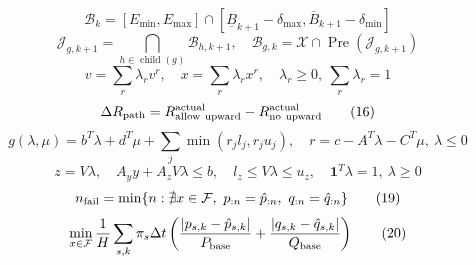 \documentclass{article}
\begin{document}
\begin{equation}
\mathcal B_k=[E_{\min},E_{\max}]\cap[\underline B_{k+1}-\delta_{\max},\overline B_{k+1}-\delta_{\min}]
\tag{13}
\end{equation}
\begin{equation}
\mathcal J_{g,k+1}=\bigcap_{h\in\operatorname{child}(g)}\mathcal B_{h,k+1},\quad\mathcal B_{g,k}=\mathcal X\cap\operatorname{Pre}(\mathcal J_{g,k+1})
\tag{14}
\end{equation}
\begin{equation}
v=\sum_r\lambda_rv^r,\quad x=\sum_r\lambda_rx^r,\quad\lambda_r\ge0,\ \sum_r\lambda_r=1
\tag{15}
\end{equation}
\begin{equation}
\Delta R_{\rm path}=R_{\rm allow\ upward}^{\rm actual}-R_{\rm no\ upward}^{\rm actual}
\tag{16}
\end{equation}
\begin{equation}
g(\lambda,\mu)=b^T\lambda+d^T\mu+\sum_j\min(r_jl_j,r_ju_j),\quad r=c-A^T\lambda-C^T\mu,\ \lambda\le0
\tag{17}
\end{equation}
\begin{equation}
z=V\lambda,\quad A_yy+A_zV\lambda\le b,\quad l_z\le V\lambda\le u_z,\quad \mathbf{1}^T\lambda=1,\ \lambda\ge0
\tag{18}
\end{equation}
\begin{equation}
n_{\rm fail}=\min\{n:\nexists x\in\mathcal F,\ p_{:n}=\hat p_{:n},\ q_{:n}=\hat q_{:n}\}
\tag{19}
\end{equation}
\begin{equation}
\min_{x\in\mathcal F}\frac{1}{H}\sum_{s,k}\pi_s\Delta t\left(\frac{|p_{s,k}-\hat p_{s,k}|}{P_{\rm base}}+\frac{|q_{s,k}-\hat q_{s,k}|}{Q_{\rm base}}\right)
\tag{20}
\end{equation}
\end{document}
